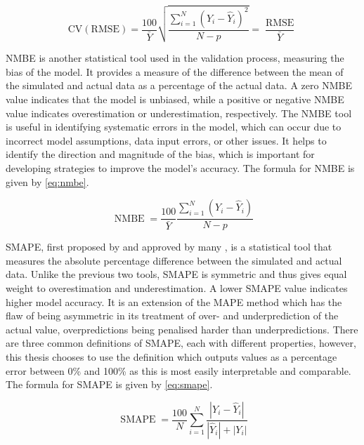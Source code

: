 \begin{equation}
    \operatorname{CV(RMSE)} = \frac{100}{\bar{Y}} \sqrt{\frac{\sum_{i=1}^N(Y_i - \hat{Y}_i)^2}{N-p}} = \frac{\operatorname{RMSE}}{\bar{Y}}  \label{eq:cvrmse}
\end{equation}

\ac{NMBE} is another statistical tool used in the validation process, measuring the bias of the model. It provides a measure of the difference between the mean of the simulated and actual data as a percentage of the actual data. A zero  \ac{NMBE} value indicates that the model is unbiased, while a positive or negative \ac{NMBE} value indicates overestimation or underestimation, respectively. The  \ac{NMBE} tool is useful in identifying systematic errors in the model, which can occur due to incorrect model assumptions, data input errors, or other issues. It helps to identify the direction and magnitude of the bias, which is important for developing strategies to improve the model's accuracy. The formula for \ac{NMBE} is given by \cref{eq:nmbe}.

\begin{equation}
    \operatorname{NMBE} = \frac{100}{\bar{Y}} \frac{\sum_{i=1}^N(Y_i - \hat{Y}_i)}{N-p} \label{eq:nmbe}
\end{equation}

\ac{SMAPE}, first proposed by \citeauthor{MAKRIDAKIS1993527} \cite{MAKRIDAKIS1993527} and approved by many \cite{tofallis_better_2015,khendek_system_2018,kim_new_2016}, is a statistical tool that measures the absolute percentage difference between the simulated and actual data. Unlike the previous two tools, \ac{SMAPE} is symmetric and thus gives equal weight to overestimation and underestimation. A lower \ac{SMAPE} value indicates higher model accuracy. It is an extension of the MAPE method which has the flaw of being asymmetric in its treatment of over- and underprediction of the actual value, overpredictions being penalised harder than underpredictions. There are three common definitions of \ac{SMAPE}, each with different properties, however, this thesis chooses to use the definition which outputs values as a percentage error between 0\% and 100\% as this is most easily interpretable and comparable. The formula for \ac{SMAPE} is given by \cref{eq:smape}.

\begin{equation}
    \operatorname{SMAPE} = \frac{100}{N} \sum_{i=1}^N\frac{|Y_i - \hat{Y}_i|}{|\hat{Y}_i|+|Y_i|} \label{eq:smape}
\end{equation}

